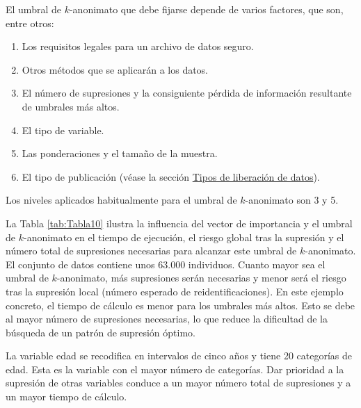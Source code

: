 \documentclass[
]{book}
\providecommand{\tightlist}{%
  \setlength{\itemsep}{0pt}\setlength{\parskip}{0pt}}
\theoremstyle{definition}
\theoremstyle{definition}
\theoremstyle{definition}
\theoremstyle{definition}
\theoremstyle{remark}
\begin{document}
El umbral de \(k\)-anonimato que debe fijarse depende de varios factores, que son, entre otros:

\begin{enumerate}
\def\labelenumi{\arabic{enumi}.}
\tightlist
\item
  Los requisitos legales para un archivo de datos seguro.
\item
  Otros métodos que se aplicarán a los datos.
\item
  El número de supresiones y la consiguiente pérdida de información resultante de umbrales más altos.
\item
  El tipo de variable.
\item
  Las ponderaciones y el tamaño de la muestra.
\item
  El tipo de publicación (véase la sección \protect\hyperlink{tipos-de-liberaciuxf3n-de-datos}{Tipos de liberación de datos}).
\end{enumerate}

Los niveles aplicados habitualmente para el umbral de \(k\)-anonimato son 3 y 5.

La Tabla \ref{tab:Tabla10} ilustra la influencia del vector de importancia y el umbral de \(k\)-anonimato en el tiempo de ejecución, el riesgo global tras la supresión y el número total de supresiones necesarias para alcanzar este umbral de \(k\)-anonimato. El conjunto de datos contiene unos 63.000 individuos. Cuanto mayor sea el umbral de \(k\)-anonimato, más supresiones serán necesarias y menor será el riesgo tras la supresión local (número esperado de reidentificaciones). En este ejemplo concreto, el tiempo de cálculo es menor para los umbrales más altos. Esto se debe al mayor número de supresiones necesarias, lo que reduce la dificultad de la búsqueda de un patrón de supresión óptimo.

La variable edad se recodifica en intervalos de cinco años y tiene 20 categorías de edad. Esta es la variable con el mayor número de categorías. Dar prioridad a la supresión de otras variables conduce a un mayor número total de supresiones y a un mayor tiempo de cálculo.
\end{document}
